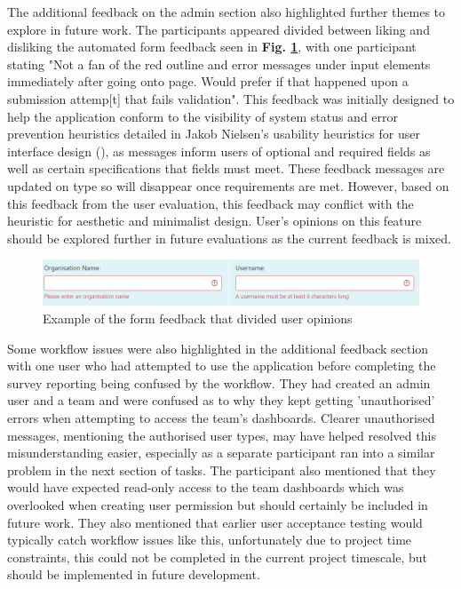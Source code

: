 \documentclass[l4proj.tex]{subfiles}
\begin{document}
The additional feedback on the admin section also highlighted further themes to explore in future work. The participants appeared divided between liking and disliking the automated form feedback seen in \textbf{Fig. \ref{fig:admin form feedback}}, with one participant stating "Not a fan of the red outline and error messages under input elements immediately after going onto page. Would prefer if that happened upon a submission attemp[t] that fails validation". This feedback was initially designed to help the application conform to the visibility of system status and error prevention heuristics detailed in Jakob Nielsen's usability heuristics for user interface design (\cite{NeilsenHeuristics}), as messages inform users of optional and required fields as well as certain specifications that fields must meet. These feedback messages are updated on type so will disappear once requirements are met. However, based on this feedback from the user evaluation, this feedback may conflict with the heuristic for aesthetic and minimalist design. User's opinions on this feature should be explored further in future evaluations as the current feedback is mixed.


\begin{figure}[h!]
\begin{center}
\includegraphics[scale=0.57]{dissertation/images/EvaluationExampleOfFormFeedback.png}
\caption{Example of the form feedback that divided user opinions}
\label{fig:admin form feedback} 
\end{center}
\end{figure}

Some workflow issues were also highlighted in the additional feedback section with one user who had attempted to use the application before completing the survey reporting being confused by the workflow. They had created an admin user and a team and were confused as to why they kept getting 'unauthorised' errors when attempting to access the team's dashboards. Clearer unauthorised messages, mentioning the authorised user types, may have helped resolved this misunderstanding easier, especially as a separate participant ran into a similar problem in the next section of tasks. The participant also mentioned that they would have expected read-only access to the team dashboards which was overlooked when creating user permission but should certainly be included in future work. They also mentioned that earlier user acceptance testing would typically catch workflow issues like this, unfortunately due to project time constraints, this could not be completed in the current project timescale, but should be implemented in future development.
\end{document}
